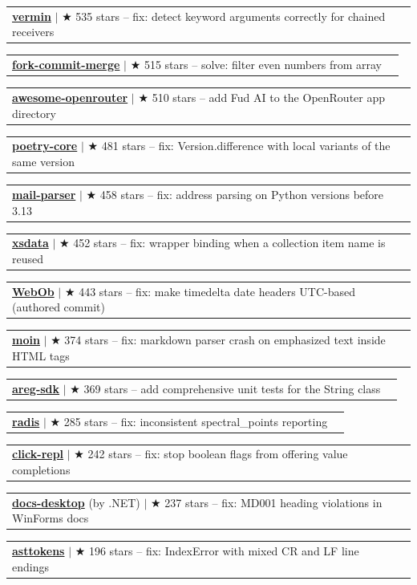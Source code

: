 \documentclass[letterpaper,11pt]{article}
\makeatletter
\newcommand{\resumeProjectHeading}[2]{
    \item
    \begin{tabular*}{0.97\textwidth}{l@{\extracolsep{\fill}}r}
      \small#1 & \hspace{8pt}\small#2 \\
    \end{tabular*}\vspace{-11.4pt}
}
\makeatother
\begin{document}
      \resumeProjectHeading{\textbf{\href{https://github.com/netromdk/vermin/pull/344}{vermin}} $|$ {\small $\bigstar$ 535 stars} \textnormal{ -- fix: detect keyword arguments correctly for chained receivers}}{}
      \resumeProjectHeading{\textbf{\href{https://github.com/fork-commit-merge/fork-commit-merge/pull/6370}{fork-commit-merge}} $|$ {\small $\bigstar$ 515 stars} \textnormal{ -- solve: filter even numbers from array}}{}
      \resumeProjectHeading{\textbf{\href{https://github.com/OpenRouterTeam/awesome-openrouter/pull/103}{awesome-openrouter}} $|$ {\small $\bigstar$ 510 stars} \textnormal{ -- add Fud AI to the OpenRouter app directory}}{}
      \resumeProjectHeading{\textbf{\href{https://github.com/python-poetry/poetry-core/pull/953}{poetry-core}} $|$ {\small $\bigstar$ 481 stars} \textnormal{ -- fix: Version.difference with local variants of the same version}}{}
      \resumeProjectHeading{\textbf{\href{https://github.com/SpamScope/mail-parser/pull/161}{mail-parser}} $|$ {\small $\bigstar$ 458 stars} \textnormal{ -- fix: address parsing on Python versions before 3.13}}{}
      \resumeProjectHeading{\textbf{\href{https://github.com/tefra/xsdata/pull/1224}{xsdata}} $|$ {\small $\bigstar$ 452 stars} \textnormal{ -- fix: wrapper binding when a collection item name is reused}}{}
      \resumeProjectHeading{\textbf{\href{https://github.com/Pylons/webob/pull/496}{WebOb}} $|$ {\small $\bigstar$ 443 stars} \textnormal{ -- fix: make timedelta date headers UTC-based (authored commit)}}{}
      \resumeProjectHeading{\textbf{\href{https://github.com/moinwiki/moin/pull/2166}{moin}} $|$ {\small $\bigstar$ 374 stars} \textnormal{ -- fix: markdown parser crash on emphasized text inside HTML tags}}{}
      \resumeProjectHeading{\textbf{\href{https://github.com/aregtech/areg-sdk/pull/675}{areg-sdk}} $|$ {\small $\bigstar$ 369 stars} \textnormal{ -- add comprehensive unit tests for the String class}}{}
      \resumeProjectHeading{\textbf{\href{https://github.com/radis/radis/pull/918}{radis}} $|$ {\small $\bigstar$ 285 stars} \textnormal{ -- fix: inconsistent spectral\_points reporting}}{}
      \resumeProjectHeading{\textbf{\href{https://github.com/click-contrib/click-repl/pull/136}{click-repl}} $|$ {\small $\bigstar$ 242 stars} \textnormal{ -- fix: stop boolean flags from offering value completions}}{}
      \resumeProjectHeading{\textbf{\href{https://github.com/dotnet/docs-desktop/pull/2197}{docs-desktop}} \textnormal{(by .NET)} $|$ {\small $\bigstar$ 237 stars} \textnormal{ -- fix: MD001 heading violations in WinForms docs}}{}
      \resumeProjectHeading{\textbf{\href{https://github.com/gristlabs/asttokens/pull/174}{asttokens}} $|$ {\small $\bigstar$ 196 stars} \textnormal{ -- fix: IndexError with mixed CR and LF line endings}}{}
\end{document}
